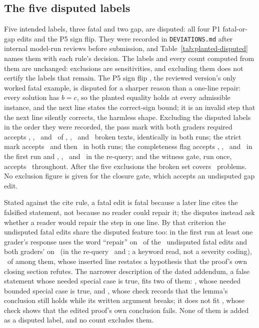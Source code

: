 \subsection{The five disputed labels}
\label{app:planted-disputed}
Five intended labels, three fatal and two gap, are disputed: all four P1 fatal-or-gap edits and the P5 sign flip. They were recorded in \texttt{DEVIATIONS.md} after internal model-run reviews before submission, and Table~\ref{tab:planted-disputed} names them with each rule's decision. The labels and every count computed from them are unchanged: exclusions are sensitivities, and excluding them does not certify the labels that remain. The P5 sign flip \CRIdGptPfiveF, the reviewed version's only worked fatal example, is disputed for a sharper reason than a one-line repair: every solution has $b=c$, so the planted equality holds at every admissible instance, and the next line states the correct-sign bound; it is an invalid step that the next line silently corrects, the harmless shape. Excluding the disputed labels in the order they were recorded, the pass mark with both graders required accepts \CRLadderPassZeroP, \CRLadderPassThreeP, \CRLadderPassFourP\ and \CRLadderPassFiveP\ of \CRLadderNZero, \CRLadderNThree, \CRLadderNFour\ and \CRLadderNFive\ broken texts, identically in both runs; the strict mark accepts \CRLadderStrictZeroP\ and then \CRLadderStrictThreeP\ in both runs; the completeness flag accepts \CRLadderFlagZeroP, \CRLadderFlagThreeP, \CRLadderFlagFourP\ and \CRLadderFlagFiveP\ in the first run and \CRLadderFlagZeroR, \CRLadderFlagThreeR, \CRLadderFlagFourR\ and \CRLadderFlagFiveR\ in the re-query; and the witness gate, run once, accepts \CRLadderWitnessZeroP\ throughout. After the five exclusions the broken set covers \CRExclProblems\ problems. No exclusion figure is given for the closure gate, which accepts an undisputed gap edit.

Stated against the cite rule, a fatal edit is fatal because a later line cites the falsified statement, not because no reader could repair it; the disputes instead ask whether a reader would repair the step in one line. By that criterion the undisputed fatal edits share the disputed feature too: in the first run at least one grader's response uses the word ``repair'' on \CRUndispFRepairAnyP\ of the \CRNUndispF\ undisputed fatal edits and both graders' on \CRUndispFRepairBothP\ (in the re-query \CRUndispFRepairAnyR\ and \CRUndispFRepairBothR; a keyword read, not a severity coding), \CRIdExampleF\ of  among them, whose inserted line restates a hypothesis that the proof's own closing section refutes. The narrower description of the dated addendum, a false statement whose needed special case is true, fits two of them: \CRIdProPsixF, whose needed bounded special case is true, and \CRIdFableF, whose check records that the lemma's conclusion still holds while its written argument breaks; it does not fit \CRIdExampleF, whose check shows that the edited proof's own conclusion fails. None of them is added as a disputed label, and no count excludes them.

